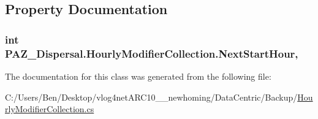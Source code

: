 \subsection{Property Documentation}
\hypertarget{class_p_a_z___dispersal_1_1_hourly_modifier_collection_a2663ad96f4a37593fc2b794f22eed8f5}{
\subsubsection[{Next\-Start\-Hour}]{\setlength{\rightskip}{0pt plus 5cm}int P\-A\-Z\-\_\-\-Dispersal.\-Hourly\-Modifier\-Collection.\-Next\-Start\-Hour\hspace{0.3cm}{\ttfamily [get]}, {\ttfamily [set]}}}\label{class_p_a_z___dispersal_1_1_hourly_modifier_collection_a2663ad96f4a37593fc2b794f22eed8f5}


The documentation for this class was generated from the following file\-:\begin{DoxyCompactItemize}
\item 
C\-:/\-Users/\-Ben/\-Desktop/vlog4net\-A\-R\-C10\-\_\-\_\-newhoming/\-Data\-Centric/\-Backup/\hyperlink{_backup_2_hourly_modifier_collection_8cs}{Hourly\-Modifier\-Collection.\-cs}\end{DoxyCompactItemize}
